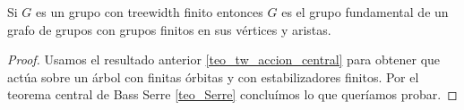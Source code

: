 \documentclass[tesis.tex]{subfiles}
\begin{document}
\begin{coro}
	Si $G$ es un grupo con treewidth finito entonces $G$ es el grupo fundamental de un grafo de grupos con grupos finitos en sus vértices y aristas.
\end{coro}
\begin{proof}
	Usamos el resultado anterior \ref{teo_tw_accion_central} para obtener que actúa sobre un árbol con finitas órbitas y con estabilizadores finitos.
	Por el teorema central de Bass Serre \ref{teo_Serre} concluímos lo que queríamos probar.
\end{proof}



\listoftodos
\end{document}
